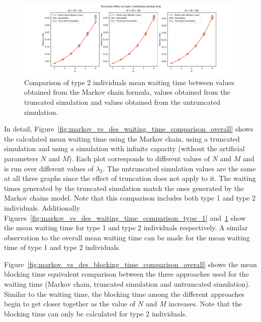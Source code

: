 \begin{figure}[H]
    \includegraphics[width=\textwidth]{chapters/03_queueing_model/img/numeric_results_and_timings/truncation_effect/waiting_time_type_2.pdf}
    \caption{
        Comparison of type 2 individuals mean waiting time between values
        obtained from the Markov chain formula, values obtained from the
        truncated simulation and values obtained from the untruncated
        simulation.
    }
    \label{fig:markov_vs_des_waiting_time_comparison_type_2}
\end{figure}

In detail, Figure~\ref{fig:markov_vs_des_waiting_time_comparison_overall} shows
the calculated mean waiting time using the Markov chain, using a truncated
simulation and using a simulation with infinite capacity (without the artificial
parameters \(N\) and \(M\)).
Each plot corresponds to different values of \(N\) and \(M\) and is run over
different values of \(\lambda_2\).
The untruncated simulation values are the same at all three graphs since
the effect of truncation does not apply to it.
The waiting times generated by the truncated simulation match the ones generated
by the Markov chains model.
Note that this comparison includes both type 1 and type 2 individuals.
Additionally Figures~\ref{fig:markov_vs_des_waiting_time_comparison_type_1}
and~\ref{fig:markov_vs_des_waiting_time_comparison_type_2} show the mean waiting
time for type 1 and type 2 individuals respectively.
A similar observation to the overall mean waiting time can be made for the mean
waiting time of type 1 and type 2 individuals.


Figure~\ref{fig:markov_vs_des_blocking_time_comparison_overall} shows
the mean blocking time equivalent comparison between the three approaches used
for the waiting time (Markov chain, truncated simulation and untruncated
simulation).
Similar to the waiting time, the blocking time among the different approaches
begin to get closer together as the value of \(N\) and \(M\) increases.
Note that the blocking time can only be calculated for type 2 individuals.

